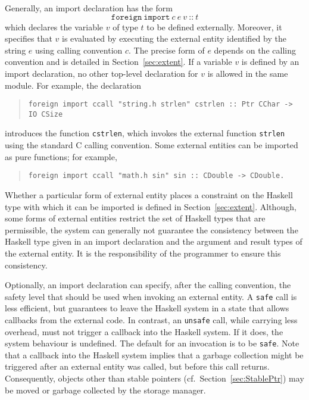 \documentclass[a4paper,twoside]{article}
\newcommand{\code}[1]{\texttt{#1}}      %
\begin{document}
Generally, an import declaration has the form
%
\[
\code{foreign}~\code{import}~c~e~v~\code{{::}}~t
\]
%
which declares the variable $v$ of type $t$ to be defined externally.
Moreover, it specifies that $v$ is evaluated by executing the external entity
identified by the string $e$ using calling convention $c$.  The precise form
of $e$ depends on the calling convention and is detailed in
Section~\ref{sec:extent}.  If a variable $v$ is defined by an import
declaration, no other top-level declaration for $v$ is allowed in the same
module.  For example, the declaration
%
\begin{quote}
\begin{verbatim}
foreign import ccall "string.h strlen" cstrlen :: Ptr CChar -> IO CSize
\end{verbatim}
\end{quote}
%
introduces the function \code{cstrlen}, which invokes the external function
\code{strlen} using the standard C calling convention.  Some external entities
can be imported as pure functions; for example,
%
\begin{quote}
\begin{verbatim}
foreign import ccall "math.h sin" sin :: CDouble -> CDouble.
\end{verbatim}
\end{quote}
%
Whether a particular form of external entity places a constraint on the
Haskell type with which it can be imported is defined in
Section~\ref{sec:extent}.  Although, some forms of external entities restrict
the set of Haskell types that are permissible, the system can generally not
guarantee the consistency between the Haskell type given in an import
declaration and the argument and result types of the external entity.  It is
the responsibility of the programmer to ensure this consistency.

Optionally, an import declaration can specify, after the calling convention,
the safety level that should be used when invoking an external entity.  A
\code{safe} call is less efficient, but guarantees to leave the Haskell system
in a state that allows callbacks from the external code.  In contrast, an
\code{unsafe} call, while carrying less overhead, must not trigger a callback
into the Haskell system.  If it does, the system behaviour is undefined.  The
default for an invocation is to be \code{safe}.  Note that a callback into
the Haskell system implies that a garbage collection might be triggered after
an external entity was called, but before this call returns.  Consequently,
objects other than stable pointers (cf.\ Section~\ref{sec:StablePtr}) may be
moved or garbage collected by the storage manager.
\end{document}
